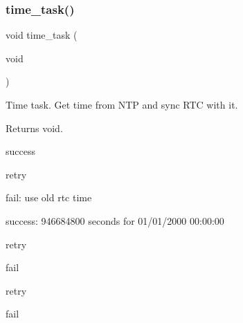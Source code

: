 \subsubsection{\texorpdfstring{time\+\_\+task()}{time\_task()}}
{\footnotesize\ttfamily void time\+\_\+task (\begin{DoxyParamCaption}\item[{void}]{ }\end{DoxyParamCaption})}



Time task. Get time from N\+TP and sync R\+TC with it. 

\begin{DoxyReturn}{Returns}
void. 
\end{DoxyReturn}
success

retry

fail\+: use old rtc time

success\+: 946684800 seconds for 01/01/2000 00\+:00\+:00

retry

fail

retry

fail 